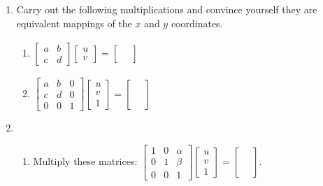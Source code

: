 \documentclass[../gatm.tex]{subfiles}
\begin{document}
\begin{enumerate}
\setcounter{enumi}{\value{mp_problem_i}}
\item Carry out the following multiplications and convince yourself they are equivalent mappings of the $x$ and $y$ coordinates.
\begin{multicols}{2}
\begin{enumerate}
\item $\left[\begin{array}{cc}a & b \\ c & d\end{array}\right]\left[\begin{array}{c} u \\ v \end{array}\right]=\left[\begin{array}{c} \phantom{u} \\ \phantom{v} \end{array}\right]$ $\phantom{\begin{array}{c}u \\ v \\ 1 \end{array}}$
\item $\left[\begin{array}{ccc}a & b & 0 \\ c & d & 0 \\ 0 & 0 & 1 \end{array}\right]\left[\begin{array}{c}u \\ v \\ 1 \end{array}\right] = \left[\begin{array}{c}\phantom{u} \\ \phantom{v} \\ \phantom{1} \end{array}\right]$
\end{enumerate}
\end{multicols}
\item \begin{enumerate}
\item Multiply these matrices: $\left[\begin{array}{ccc} 1 & 0 & \alpha \\ 0 & 1 & \beta \\ 0 & 0 & 1 \end{array}\right]\left[\begin{array}{c}u \\ v \\ 1 \end{array}\right]=\left[\begin{array}{c}\phantom{u} \\ \phantom{v} \\ \phantom{1}\end{array}\right].$ \label{prob:translation_matrix}

\end{enumerate}
\end{enumerate}
\end{document}
